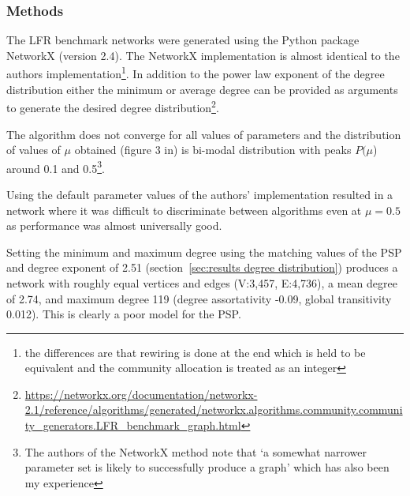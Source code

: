 





\subsubsection{Methods}
\label{sec:LFT methods}
The LFR benchmark networks were generated using the Python package NetworkX (version 2.4)\cite{hagberg2008exploring}. The NetworkX implementation is almost identical to the authors implementation\footnote{the differences are that rewiring is done at the end which is held to be equivalent and the community allocation is treated as an integer}. In addition to the power law exponent of the degree distribution either the minimum or average degree can be provided as arguments to generate the desired degree distribution\footnote{\tiny\url{https://networkx.org/documentation/networkx-2.1/reference/algorithms/generated/networkx.algorithms.community.community_generators.LFR_benchmark_graph.html}}.

The algorithm does not converge for all values of parameters and the distribution of values of $\mu$ obtained (figure 3 in\cite{lancichinetti2008benchmark}) is bi-modal distribution with peaks $P(\mu$) around 0.1 and 0.5\footnote{The authors of the NetworkX method note that `a somewhat narrower parameter set is likely to successfully produce a graph' which has also been my experience}.

Using the default parameter values of the authors' implementation resulted in a network where it was difficult to discriminate between algorithms even at $\mu=0.5$ as performance was almost universally good. 

Setting the minimum and maximum degree using the matching values of the PSP and degree exponent of 2.51 (section~\ref{sec:results degree distribution}) produces a network with  roughly equal vertices and edges (V:3,457, E:4,736), a mean degree of 2.74, and maximum degree 119 (degree assortativity -0.09, global transitivity 0.012). This is clearly a poor model for the PSP.

